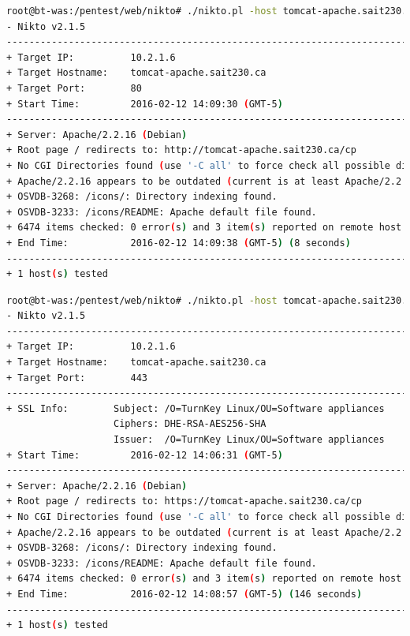 \documentclass{article}
\begin{document}
\begin{lstlisting}[language=Bash]
root@bt-was:/pentest/web/nikto# ./nikto.pl -host tomcat-apache.sait230.ca -p 80
- Nikto v2.1.5
---------------------------------------------------------------------------
+ Target IP:          10.2.1.6
+ Target Hostname:    tomcat-apache.sait230.ca
+ Target Port:        80
+ Start Time:         2016-02-12 14:09:30 (GMT-5)
---------------------------------------------------------------------------
+ Server: Apache/2.2.16 (Debian)
+ Root page / redirects to: http://tomcat-apache.sait230.ca/cp
+ No CGI Directories found (use '-C all' to force check all possible dirs)
+ Apache/2.2.16 appears to be outdated (current is at least Apache/2.2.19). Apache 1.3.42 (final release) and 2.0.64 are also current.
+ OSVDB-3268: /icons/: Directory indexing found.
+ OSVDB-3233: /icons/README: Apache default file found.
+ 6474 items checked: 0 error(s) and 3 item(s) reported on remote host
+ End Time:           2016-02-12 14:09:38 (GMT-5) (8 seconds)
---------------------------------------------------------------------------
+ 1 host(s) tested
\end{lstlisting}

\begin{lstlisting}[language=Bash]
root@bt-was:/pentest/web/nikto# ./nikto.pl -host tomcat-apache.sait230.ca -p 443
- Nikto v2.1.5
---------------------------------------------------------------------------
+ Target IP:          10.2.1.6
+ Target Hostname:    tomcat-apache.sait230.ca
+ Target Port:        443
---------------------------------------------------------------------------
+ SSL Info:        Subject: /O=TurnKey Linux/OU=Software appliances
                   Ciphers: DHE-RSA-AES256-SHA
                   Issuer:  /O=TurnKey Linux/OU=Software appliances
+ Start Time:         2016-02-12 14:06:31 (GMT-5)
---------------------------------------------------------------------------
+ Server: Apache/2.2.16 (Debian)
+ Root page / redirects to: https://tomcat-apache.sait230.ca/cp
+ No CGI Directories found (use '-C all' to force check all possible dirs)
+ Apache/2.2.16 appears to be outdated (current is at least Apache/2.2.19). Apache 1.3.42 (final release) and 2.0.64 are also current.
+ OSVDB-3268: /icons/: Directory indexing found.
+ OSVDB-3233: /icons/README: Apache default file found.
+ 6474 items checked: 0 error(s) and 3 item(s) reported on remote host
+ End Time:           2016-02-12 14:08:57 (GMT-5) (146 seconds)
---------------------------------------------------------------------------
+ 1 host(s) tested
\end{lstlisting}
\end{document}
